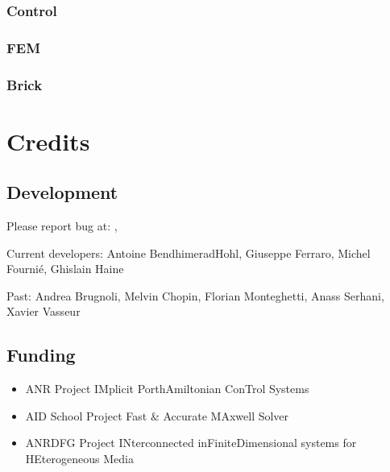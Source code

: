 \documentclass[letterpaper,10pt,english]{sphinxmanual}
\begin{document}
\subsection{Control}
\label{\detokenize{scrimp:control}}

\subsection{FEM}
\label{\detokenize{scrimp:fem}}

\subsection{Brick}
\label{\detokenize{scrimp:brick}}

\chapter{Credits}
\label{\detokenize{index:credits}}

\section{Development}
\label{\detokenize{index:development}}
\sphinxAtStartPar
Please report bug at: , 

\sphinxAtStartPar
Current developers: Antoine Bendhimerad\sphinxhyphen{}Hohl, Giuseppe Ferraro, Michel Fournié, Ghislain Haine

\sphinxAtStartPar
Past: Andrea Brugnoli, Melvin Chopin, Florian Monteghetti, Anass Serhani, Xavier Vasseur

\sphinxAtStartPar
{} 


\section{Funding}
\label{\detokenize{index:funding}}\begin{itemize}
\item {} 
\sphinxAtStartPar
ANR Project  \textendash{} IMplicit Port\sphinxhyphen{}hAmiltonian ConTrol Systems

\item {} 
\sphinxAtStartPar
AID School Project  \textendash{} Fast \& Accurate MAxwell Solver

\item {} 
\sphinxAtStartPar
ANR\sphinxhyphen{}DFG Project  \textendash{} INterconnected inFinite\sphinxhyphen{}Dimensional systems for HEterogeneous Media

\end{itemize}
\end{document}

